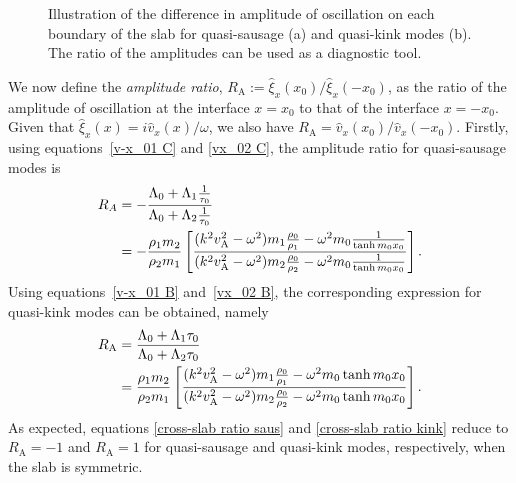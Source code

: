 \documentclass[namedreferences]{solarphysics}
\numberwithin{equation}{section}
\begin{document}
\begin{article}
\begin{figure}
{{{
}}}
\caption{Illustration of the difference in amplitude of oscillation on each boundary of the slab for quasi-sausage (a) and quasi-kink modes (b). The ratio of the amplitudes can be used as a diagnostic tool.}
\end{figure}

We now define the \emph{amplitude ratio}, $R_\textrm{A} := \widehat{\xi}_x(x_0) / \widehat{\xi}_x(-x_0)$, as the ratio of the amplitude of oscillation at the interface $x=x_0$ to that of the interface $x=-x_0$. Given that ${\widehat{\xi}_x(x) = i\widehat{v}_x(x) / \omega}$, we also have $R_\textrm{A} = \widehat{v}_x(x_0) / \widehat{v}_x(-x_0)$. Firstly, using equations~\eqref{v-x_01 C} and \eqref{vx_02 C}, the amplitude ratio for quasi-sausage modes is
\begin{align}
R_A &=-\frac{\Lambda_0+\Lambda_1\frac{1}{\tau_0}}{\Lambda_0+\Lambda_2\frac{1}{\tau_0}} \notag \\
	&=-\frac{\rho_1m_2}{\rho_2m_1}\left[\frac{(k^2v_\textrm{A}^2-\omega^2)m_1\frac{\rho_0}{\rho_1}-\omega^2m_0\frac{1}{\tanh{m_0x_0}}}{(k^2v_\textrm{A}^2-\omega^2)m_2\frac{\rho_0}{\rho_2}-\omega^2m_0\frac{1}{\tanh{m_0x_0}}}\right]. \label{cross-slab ratio saus}
\end{align}
Using equations~\eqref{v-x_01 B} and~\eqref{vx_02 B}, the corresponding expression for quasi-kink modes can be obtained, namely
\begin{align}
R_\textrm{A}&=\frac{\Lambda_0+\Lambda_1\tau_0}{\Lambda_0+\Lambda_2\tau_0} \notag \\
	&=\frac{\rho_1m_2}{\rho_2m_1}\left[\frac{(k^2v_\textrm{A}^2-\omega^2)m_1\frac{\rho_0}{\rho_1}-\omega^2m_0\tanh{m_0x_0}}{(k^2v_\textrm{A}^2-\omega^2)m_2\frac{\rho_0}{\rho_2}-\omega^2m_0\tanh{m_0x_0}}\right]. \label{cross-slab ratio kink}
\end{align}
As expected, equations \eqref{cross-slab ratio saus} and \eqref{cross-slab ratio kink} reduce to $R_\textrm{A} = -1$ and $R_\textrm{A} = 1$ for quasi-sausage and quasi-kink modes, respectively, when the slab is symmetric.


\end{article}
\end{document}
